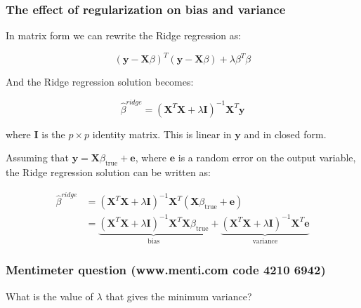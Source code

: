 \documentclass[notes]{beamer}          %
\begin{document}
\begin{frame}
\frametitle{The effect of regularization on bias and variance}
In matrix form we can rewrite the Ridge regression as:

\begin{equation*}
    (\mathbf{y} - \mathbf{X}\beta)^T (\mathbf{y} - \mathbf{X}\beta) + \lambda\beta^T\beta
\end{equation*}

And the Ridge regression solution becomes:

\begin{equation*}
    \hat{\beta}^{ridge} = (\mathbf{X}^T \mathbf{X} + \lambda \mathbf{I})^{-1}\mathbf{X}^T\mathbf{y} 
\end{equation*}

where $\mathbf{I}$ is the $p \times p$ identity matrix. This is linear in $\mathbf{y}$ and in closed form.

Assuming that $\mathbf{y} = \mathbf{X}\beta_{\mathrm{true}} + \mathbf{e}$, where $\mathbf{e}$ is a random error on the output variable, the Ridge regression solution can be written as:

\begin{align*}
    \hat{\beta}^{ridge} &= (\mathbf{X}^T \mathbf{X} + \lambda \mathbf{I})^{-1}\mathbf{X}^T(\mathbf{X}\beta_{\mathrm{true}} + \mathbf{e}) \\
    &= \underbrace{(\mathbf{X}^T \mathbf{X} + \lambda \mathbf{I})^{-1}\mathbf{X}^T\mathbf{X}\beta_{\mathrm{true}}}_{\textrm{bias}} + \underbrace{(\mathbf{X}^T \mathbf{X} + \lambda \mathbf{I})^{-1}\mathbf{X}^T\mathbf{e}}_{\textrm{variance}}
\end{align*}

\end{frame}

\begin{frame}
\frametitle{Mentimeter question (www.menti.com code 4210 6942)}

What is the value of $\lambda$ that gives the minimum variance?

\end{frame}
\end{document}
